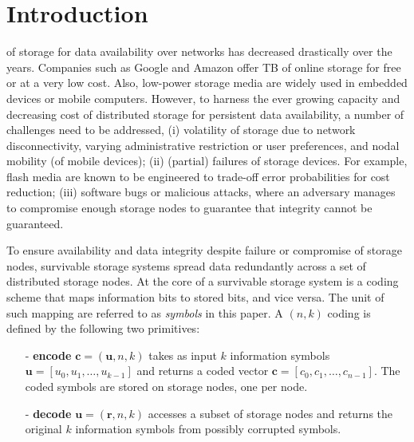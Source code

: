\documentclass[10pt,journal,letterpaper,compsoc]{IEEEtran}
\newcommand{\0}{{\bf 0}}
\begin{document}
\IEEEpeerreviewmaketitle


\section{Introduction}
\label{sect:intro}


 of storage for data availability over networks has decreased drastically over the years.  Companies such
as Google and Amazon offer TB of online storage for free or at a very low
cost.  Also, low-power storage media are widely used in embedded devices
or mobile computers. However, to harness the ever growing capacity and
decreasing cost of distributed storage for persistent data availability, a number of challenges need to be
addressed, (i) volatility of storage due to network
disconnectivity, varying administrative restriction or user preferences, and
nodal mobility (of mobile devices); (ii) (partial) failures of storage devices.
For example, flash media are known to be engineered to trade-off error
probabilities for cost reduction; (iii) software bugs or malicious attacks, where an
adversary manages to compromise enough storage nodes to guarantee that integrity cannot be guaranteed.

To ensure availability and data integrity despite failure or compromise of storage nodes,
survivable storage systems spread data redundantly across a set of distributed
storage nodes. At the core of a survivable storage system is a coding scheme
that maps information bits to stored bits, and vice versa. 
The unit of such mapping are referred to as \emph{symbols} in this paper. A $(n,k)$ coding is
defined by the following two primitives:
\begin{itemize}
\item[-] {\bf encode} $\mathbf{c} = (\mathbf{u}, n, k)$ takes as input 
$k$ information symbols $\mathbf{u} = [u_0, u_1, \ldots, u_{k-1}]$ and
returns a coded
vector $\mathbf{c} = [c_0, c_1, \ldots, c_{n-1}]$.
The coded symbols are stored on storage nodes, one per node.
\item[-] {\bf decode} $\mathbf{u} = (\mathbf{r}, n, k)$ accesses a
subset of storage nodes and returns the original $k$ information symbols from possibly
corrupted symbols.
\end{itemize}
\end{document}
